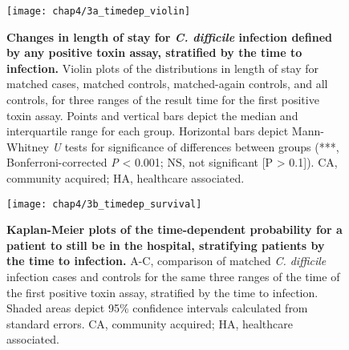 \begin{figure}[htb]
  \texttt{[image: chap4/3a\_timedep\_violin]}
  \caption[Changes in length of stay for \emph{C. difficile} infection defined by any positive toxin assay, stratified by the time to infection]{
    \textbf{Changes in length of stay for \emph{C. difficile} infection defined by any positive toxin assay, stratified by the time to infection.} Violin plots of the distributions in length of stay for matched cases, matched controls, matched-again controls, and all controls, for three ranges of the result time for the first positive toxin assay. Points and vertical bars depict the median and interquartile range for each group. Horizontal bars depict Mann-Whitney \emph{U} tests for significance of differences between groups (***, Bonferroni-corrected \emph{P} < 0.001; NS, not significant [P > 0.1]). CA, community acquired; HA, healthcare associated.
  }
  \label{fig:timedep_violin}
\end{figure}
\begin{figure}[htb]
  \texttt{[image: chap4/3b\_timedep\_survival]}
  \caption[Kaplan-Meier plots for length of stay, stratifying patients by the time to infection]{\textbf{Kaplan-Meier plots of the time-dependent probability for a patient to still be in the hospital, stratifying patients by the time to infection.} A-C, comparison of matched \emph{C. difficile} infection cases and controls for the same three ranges of the time of the first positive toxin assay, stratified by the time to infection. Shaded areas depict 95\% confidence intervals calculated from standard errors. CA, community acquired; HA, healthcare associated.
  }
  \label{fig:timedep_survival}
\end{figure}

